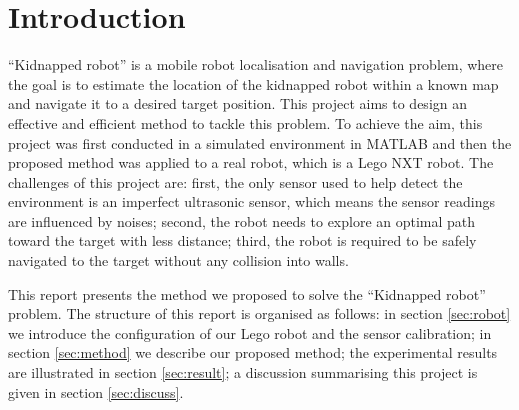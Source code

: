 \section*{Introduction}

``Kidnapped robot'' is a mobile robot localisation and navigation problem, where the goal is to estimate the location of the kidnapped robot within a known map and navigate it to a desired target position. This project aims to design an effective and efficient method to tackle this problem. To achieve the aim, this project was first conducted in a simulated environment in MATLAB and then the proposed method was applied to a real robot, which is a Lego NXT robot. The challenges of this project are: first, the only sensor used to help detect the environment is an imperfect ultrasonic sensor, which means the sensor readings are influenced by noises; second, the robot needs to explore an optimal path toward the target with less distance; third, the robot is required to be safely navigated to the target without any collision into walls.

This report presents the method we proposed to solve the ``Kidnapped robot'' problem. The structure of this report is organised as follows: in section \ref{sec:robot} we introduce the configuration of our Lego robot and the sensor calibration; in section \ref{sec:method} we describe our proposed method; the experimental results are illustrated in section \ref{sec:result}; a discussion summarising this project is given in section \ref{sec:discuss}.

